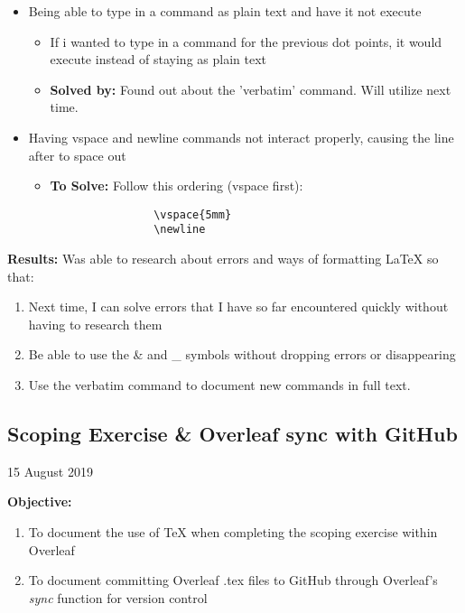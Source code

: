 \documentclass{article}
\begin{document}
\begin{itemize}
\begin{itemize}
        \item \textbf{Solved by:} checking where I have incorrectly used a double backslash or newline. Error went away
    \end{itemize}
    \item Being able to type in a command as plain text and have it not execute
        \begin{itemize}
            \item If i wanted to type in a command for the previous dot points, it would execute instead of staying as plain text
            \item \textbf{Solved by:} Found out about the 'verbatim' command. Will utilize next time.
        \end{itemize}
    \item Having vspace and newline commands not interact properly, causing the line after to space out
        \begin{itemize}
            \item \textbf{To Solve:} Follow this ordering (vspace first):
            \begin{verbatim}
                \vspace{5mm}
                \newline
            \end{verbatim}
        \end{itemize}
\end{itemize}
\textbf{Results:} Was able to research about errors and ways of formatting LaTeX so that:
\begin{enumerate}
    \item Next time, I can solve errors that I have so far encountered quickly without having to research them
    \item Be able to use the \& and \_ symbols without dropping errors or disappearing
    \item Use the verbatim command to document new commands in full text.
\end{enumerate}
\newpage
\begin{center}
\section*{Scoping Exercise \& Overleaf sync with GitHub}
15 August 2019
\end{center}
\textbf{Objective:}
\begin{enumerate}
    \item To document the use of TeX when completing the scoping exercise within Overleaf
    \item To document committing Overleaf .tex files to GitHub through Overleaf's \textit{sync} function for version control
\end{enumerate}
\end{document}
